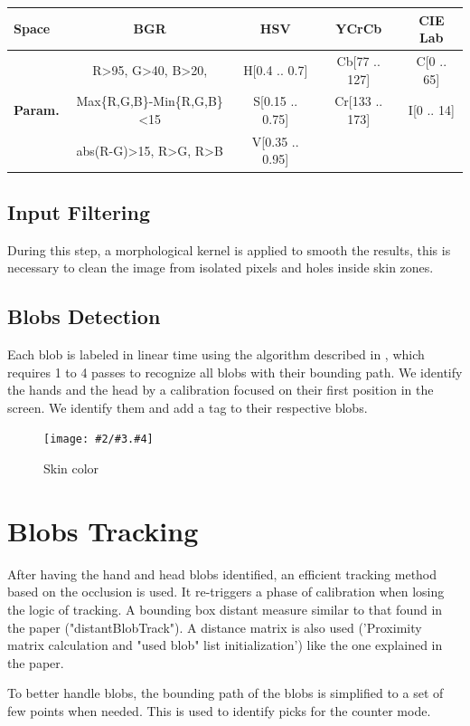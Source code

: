 \documentclass{llncs}
\newcommand\ignore[1]{}
\newcommand{\imagepathext}[5]{%
\begin{figure}[!htbp]
\hfil\texttt{[image: \#2/\#3.\#4]}\hfil
\caption{#5\label{#3}}
\end{figure}}
\newcommand{\png}[2]{\imagepathext{width=\columnwidth}{pics}{#1}{png}{#2}}
\begin{document}
\begin{center}
\begin{tabular}{|l|c|c|c|c|}
\hline
\textbf{Space} & BGR & HSV & YCrCb & CIE Lab\\
\hline
 & R\textgreater 95, G\textgreater 40, B\textgreater 20, & H[0.4 .. 0.7] & Cb[77 .. 127] & C[0 .. 65] \\
\textbf{Param.} & Max\{R,G,B\}-Min\{R,G,B\}\textless 15 & S[0.15 .. 0.75] & Cr[133 .. 173] & I[0 .. 14] \\
 & abs(R-G)\textgreater 15, R\textgreater G, R\textgreater B & V[0.35 .. 0.95] & & \\
\hline
\end{tabular}
\end{center}

\subsection{Input Filtering}
During this step, a morphological kernel is applied to smooth the results,
this is necessary to clean the image from isolated pixels and holes inside skin
zones.

\subsection{Blobs Detection}
Each blob is labeled in linear time using the algorithm described in \cite{CompLabeling} , which requires 1 to 4 passes to recognize all blobs with their bounding path.
We identify the hands and the head by a calibration focused on their first position in the screen. We identify them and add a tag to their respective blobs.

\png{skincolor}{Skin color}
\section{Blobs Tracking}
After having the hand and head blobs identified, an efficient tracking method based on the occlusion is used. It re-triggers a phase of calibration when losing the logic of tracking.
A bounding box distant measure similar to that found in the paper \cite{app06} ("distantBlobTrack"). A distance matrix is also used ('Proximity matrix calculation and "used blob" list initialization') like the one explained in the paper. 
\ignore{
When the matrix of distance is set up, there are some loops:
* A loop for detect inactive tracks: those tracks with no blobs near.
* Detect and create new tracks: those blobs without a track near.
* A loop to assign blobs to tracks. It makes clusters with blobs that are close and assign them to a track. In this step some tracks could merge in one.
* At the end, all inactive tracks are checked to delete the old ones.
}
To better handle blobs, the bounding path of the blobs is simplified to a set of few points when needed. This is used to identify picks for the counter mode.
\end{document}
